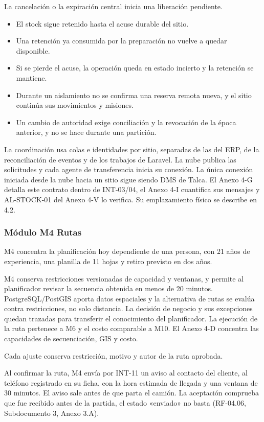 La cancelación o la expiración central inicia una liberación pendiente.

\begin{itemize}
  \item El stock sigue retenido hasta el acuse durable del sitio.
  \item Una retención ya consumida por la preparación no vuelve a quedar disponible.
  \item Si se pierde el acuse, la operación queda en estado incierto y la retención se mantiene.
  \item Durante un aislamiento no se confirma una reserva remota nueva, y el sitio continúa sus movimientos y misiones.
  \item Un cambio de autoridad exige conciliación y la revocación de la época anterior, y no se hace durante una partición.
\end{itemize}

La coordinación usa colas e identidades por sitio, separadas de las del ERP, de la reconciliación de eventos y de los trabajos de Laravel. La nube publica las solicitudes y cada agente de transferencia inicia su conexión. La única conexión iniciada desde la nube hacia un sitio sigue siendo DMS de Talca. El Anexo 4-G detalla este contrato dentro de INT-03/04, el Anexo 4-I cuantifica sus mensajes y AL-STOCK-01 del Anexo 4-V lo verifica. Su emplazamiento físico se describe en 4.2.

\subsubsection{Módulo M4 Rutas}

M4 concentra la planificación hoy dependiente de una persona, con 21 años de experiencia, una planilla de 11 hojas y retiro previsto en dos años.

M4 conserva restricciones versionadas de capacidad y ventanas, y permite al planificador revisar la secuencia obtenida en menos de 20 minutos. PostgreSQL/PostGIS aporta datos espaciales y la alternativa de rutas se evalúa contra restricciones, no solo distancia. La decisión de negocio y sus excepciones quedan trazadas para transferir el conocimiento del planificador. La ejecución de la ruta pertenece a M6 y el costo comparable a M10. El Anexo 4-D concentra las capacidades de secuenciación, GIS y costo.

Cada ajuste conserva restricción, motivo y autor de la ruta aprobada.

Al confirmar la ruta, M4 envía por INT-11 un aviso al contacto del cliente, al teléfono registrado en su ficha, con la hora estimada de llegada y una ventana de 30 minutos. El aviso sale antes de que parta el camión. La aceptación comprueba que fue recibido antes de la partida, el estado «enviado» no basta (RF-04.06, Subdocumento 3, Anexo 3.A).

